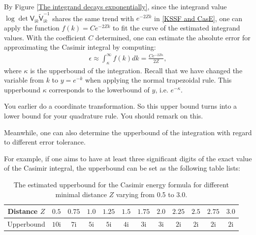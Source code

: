 \begin{remark}\label{remark for upperbound determination}
    By Figure \ref{The integrand decays exponentially}, since the integrand value $\log\det\mathsf{V}_{\mathrm{i}k}\tilde{\mathsf{V}}_{\mathrm{i}k}^{-1}$ 
    shares the same trend with $e^{-2Zk}$ in \eqref{KSSF and CasE}, one can apply the function $f(k) = Ce^{-2Zk}$ to fit the curve of the estimated integrand
    values. With the coefficient $C$ determined, one can estimate the absolute error for approximating the Casimir integral by computing:  
    \begin{align*}
        \epsilon \approx \int_{\kappa}^{\infty}f(k)dk = \frac{Ce^{-2Z\kappa}}{2Z},
    \end{align*}
    where $\kappa$ is the upperbound of the integration. {\color{teal} Recall that we have changed the variable from $k$ to $y = e^{-k}$ when applying the normal
    trapezoidal rule. This upperbound $\kappa$ corresponds to the lowerbound of $y$, i.e. $e^{-\kappa}$.}
    
{\color{red} You earlier do a coordinate transformation. So this upper bound turns into a lower bound for your quadrature rule. You should remark on this}.
    
Meanwhile, one can also determine the upperbound of the integration with regard to different error tolerance. 

For example, if one aims to have at least three significant digits of the exact value of the Casimir integral, the upperbound can be set as the following 
table lists:

\begin{table}[H]
    \centering
    \begin{tabular}{ |c|c|c|c|c|c|c|c|c|c|c|c| }
        \hline
        Distance $Z$ & $ 0.5$ & $ 0.75$  & $ 1.0$ & $1.25$ & $ 1.5$ & $1.75$  & $2.0$ & $2.25$ & $ 2.5$ & $ 2.75$  & $3.0$ \\\hline
        Upperbound & $10\mathrm{i}$ & $7\mathrm{i}$ & $5\mathrm{i}$ & $5\mathrm{i}$ & $4\mathrm{i}$ & $3\mathrm{i}$ & $3\mathrm{i}$ & $2\mathrm{i}$ & $2\mathrm{i}$ & $2\mathrm{i}$ & $2\mathrm{i}$ \\\hline
       \end{tabular}
       \caption{\label{Equal: distance and upperbound error tolerance} The estimated upperbound for the Casimir energy formula for different minimal distance $Z$ varying from 
       0.5 to 3.0.}
\end{table}
\end{remark}

